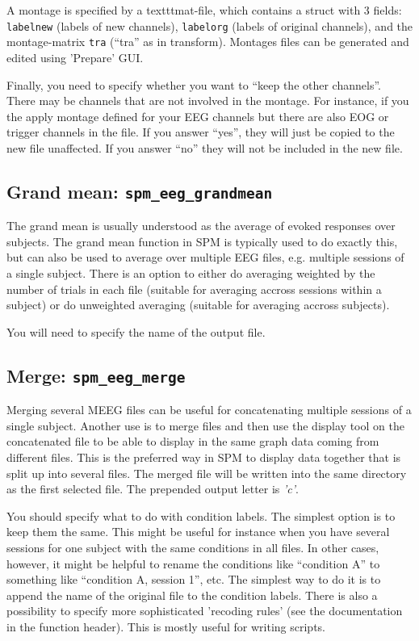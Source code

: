 A montage is specified by a texttt{mat}-file, which contains a struct with 3 fields: \texttt{labelnew} (labels of new channels), \texttt{labelorg} (labels of original channels), and the montage-matrix \texttt{tra} (``tra'' as in transform). Montages files can be generated and edited using 'Prepare' GUI. 

Finally, you need to specify whether you want to ``keep the other channels''. There may be channels that are not involved in the montage. For instance, if you the apply montage defined for your EEG channels but there are also EOG or trigger channels in the file. If you answer ``yes'', they will just be copied to the new file unaffected. If you answer ``no'' they will not be included in the new file.

\subsection{Grand mean: \texttt{spm\_eeg\_grandmean}}
The grand mean is usually understood as the average of evoked responses over subjects. The grand mean function in SPM is typically used to do exactly this, but can also be used to average over multiple EEG files, e.g. multiple sessions of a single subject. There is an option to either do averaging weighted by the number of trials in each file (suitable for averaging accross sessions within a subject) or do unweighted averaging (suitable for averaging accross subjects).

You will need to specify the name of the output file. 

\subsection{Merge: \texttt{spm\_eeg\_merge}}
Merging several MEEG files can be useful for concatenating multiple sessions of a single subject. Another use is to merge files and then use the display tool on the concatenated file to be able to display in the same graph data coming from different files. This is the preferred way in SPM to display data together that is split up into several files. The merged file will be written into the same directory as the first selected file. The prepended output letter is \textit{'c'}.

You should specify what to do with condition labels. The simplest option is to keep them the same. This might be useful for instance when you have several sessions for one subject with the same conditions in all files. In other cases, however, it might be helpful to rename the conditions like ``condition A'' to something like ``condition A, session 1'', etc. The simplest way to do it is to append the name of the original file to the condition labels. There is also a possibility to specify more sophisticated 'recoding rules' (see the documentation in the function header). This is mostly useful for writing scripts.

